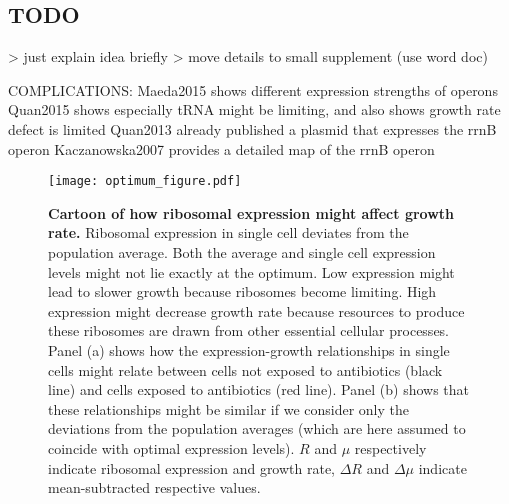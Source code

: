 \subsection{TODO}

> just explain idea briefly
> move details to small supplement (use word doc)

COMPLICATIONS:
Maeda2015 shows different expression strengths of operons
Quan2015 shows especially tRNA might be limiting, and also shows growth rate defect is limited
Quan2013 already published a plasmid that expresses the rrnB operon
Kaczanowska2007 provides a detailed map of the rrnB operon

\begin{figure}
    \centering
    \texttt{[image: optimum\_figure.pdf]}
    \caption{ 
        \textbf{Cartoon of how ribosomal expression might affect growth rate.}
        Ribosomal expression in single cell deviates from the population average. 
        Both the average and single cell expression levels might not lie exactly at the optimum.
        Low expression might lead to slower growth because ribosomes become limiting.
        High expression might decrease growth rate because resources to produce these ribosomes are drawn from other essential cellular processes.
        Panel (a) shows how the expression-growth relationships in single cells might relate between cells not exposed to antibiotics (black line) and cells exposed to antibiotics (red line). Panel (b) shows that these relationships might be similar if we consider only the deviations from the population averages (which are here assumed to coincide with optimal expression levels). $R$ and $\mu$ respectively indicate ribosomal expression and growth rate, $\Delta{R}$ and $\Delta{\mu}$ indicate mean-subtracted respective values.%
    }
    \label{fig:ribo:optimumCartoon}
\end{figure}

